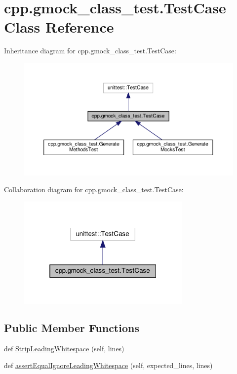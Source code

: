 \hypertarget{classcpp_1_1gmock__class__test_1_1_test_case}{}\section{cpp.\+gmock\+\_\+class\+\_\+test.\+Test\+Case Class Reference}
\label{classcpp_1_1gmock__class__test_1_1_test_case}


Inheritance diagram for cpp.\+gmock\+\_\+class\+\_\+test.\+Test\+Case\+:
\nopagebreak
\begin{figure}[H]
\begin{center}
\leavevmode
\includegraphics[width=350pt]{classcpp_1_1gmock__class__test_1_1_test_case__inherit__graph}
\end{center}
\end{figure}


Collaboration diagram for cpp.\+gmock\+\_\+class\+\_\+test.\+Test\+Case\+:
\nopagebreak
\begin{figure}[H]
\begin{center}
\leavevmode
\includegraphics[width=241pt]{classcpp_1_1gmock__class__test_1_1_test_case__coll__graph}
\end{center}
\end{figure}
\subsection*{Public Member Functions}
\begin{DoxyCompactItemize}
\item 
def \hyperlink{classcpp_1_1gmock__class__test_1_1_test_case_a366b15717eebc41e397357868c5734c5}{Strip\+Leading\+Whitespace} (self, lines)
\item 
def \hyperlink{classcpp_1_1gmock__class__test_1_1_test_case_a68f88bba11511f8c582123d47bf80464}{assert\+Equal\+Ignore\+Leading\+Whitespace} (self, expected\+\_\+lines, lines)
\end{DoxyCompactItemize}


